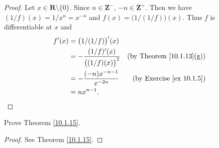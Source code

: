 \begin{proof}
    Let \(x \in \mathbf{R} \setminus \{0\}\).
    Since \(n \in \mathbf{Z}^-\), \(-n \in \mathbf{Z}^+\).
    Then we have \((1 / f)(x) = 1 / x^n = x^{-n}\) and \(f(x) = \big(1 / (1 / f)\big)(x)\).
    Thus \(f\) is differentiable at \(x\) and
    \begin{align*}
        f'(x) & = \big(1 / (1 / f)\big)'(x)                                                          \\
              & = -\frac{(1 / f)'(x)}{\big((1 / f)(x)\big)^2} & \text{(by Theorem \ref{10.1.13}(g))} \\
              & = -\frac{(-n) x^{-n - 1}}{x^{-2n}}            & \text{(by Exercise \ref{ex 10.1.5})} \\
              & = n x^{n - 1}.
    \end{align*}
\end{proof}

\begin{exercise}\label{ex 10.1.7}
    Prove Theorem \ref{10.1.15}.
\end{exercise}

\begin{proof}
    See Theorem \ref{10.1.15}.
\end{proof}